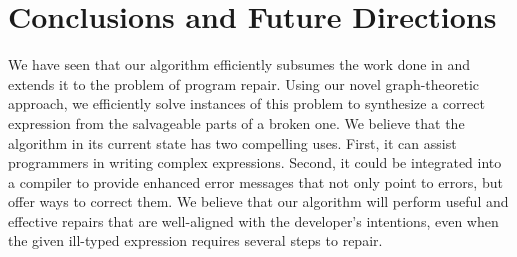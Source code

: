 \section{Conclusions and Future Directions}
\label{sec:concl}
We have seen that our algorithm efficiently subsumes the work done in \cite{GveroETAL13CompleteCompletionTypesWeights, MandelinetALL2005Jungloid, PerelmanGBG12} and extends it to the problem of program repair. Using our novel graph-theoretic approach, we efficiently solve instances of this problem to synthesize a correct expression from the salvageable parts of a broken one. We believe that the algorithm in its current state has two compelling uses. First, it can assist programmers in writing complex expressions. Second, it could be integrated into a compiler to provide enhanced error messages that not only point to errors, but offer ways to correct them. We believe that our algorithm will perform useful and effective repairs that are well-aligned with the developer's intentions, even when the given ill-typed expression requires several steps to repair.
